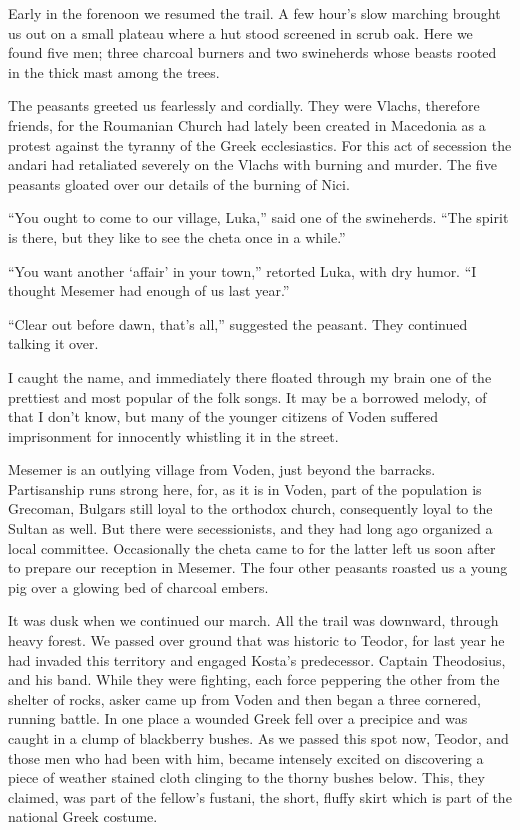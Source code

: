 \documentclass[a5paper,12pt]{book}
\begin{document}
Early in the forenoon we resumed the trail. A few hour’s slow marching brought us out on a small plateau where a hut stood screened in scrub oak. Here we found five men; three charcoal burners and two swineherds whose beasts rooted in the thick mast among the trees. 

The peasants greeted us fearlessly and cordially. They were Vlachs, therefore friends, for the Roumanian Church had lately been created in Macedonia as a protest against the tyranny of the Greek ecclesiastics. For this act of secession the andari had retaliated severely on the Vlachs with burning and murder. The five peasants gloated over our details of the burning of Nici. 

“You ought to come to our village, Luka,” said one of the swineherds. “The spirit is there, but they like to see the cheta once in a while.” 

“You want another ‘affair’ in your town,” retorted Luka, with dry humor. “I thought Mesemer had enough of us last year.” 

“Clear out before dawn, that’s all,” suggested the peasant. They continued talking it over. 

I caught the name, and immediately there floated through my brain one of the prettiest and most popular of the folk songs. It may be a borrowed melody, of that I don’t know, but many of the younger citizens of Voden suffered imprisonment for innocently whistling it in the street. 

Mesemer is an outlying village from Voden, just beyond the barracks. Partisanship runs strong here, for, as it is in Voden, part of the population is Grecoman, Bulgars still loyal to the orthodox church, consequently loyal to the Sultan as well. But there were secessionists, and they had long ago organized a local committee. Occasionally the cheta came to for the latter left us soon after to prepare our reception in Mesemer. The four other peasants roasted us a young pig over a glowing bed of charcoal embers. 

It was dusk when we continued our march. All the trail was downward, through heavy forest. We passed over ground that was historic to Teodor, for last year he had invaded this territory and engaged Kosta’s predecessor. Captain Theodosius, and his band. While they were fighting, each force peppering the other from the shelter of rocks, asker came up from Voden and then began a three cornered, running battle. In one place a wounded Greek fell over a precipice and was caught in a clump of blackberry bushes. As we passed this spot now, Teodor, and those men who had been with him, became intensely excited on discovering a piece of weather stained cloth clinging to the thorny bushes below. This, they claimed, was part of the fellow’s fustani, the short, fluffy skirt which is part of the national Greek costume. 
\end{document}

